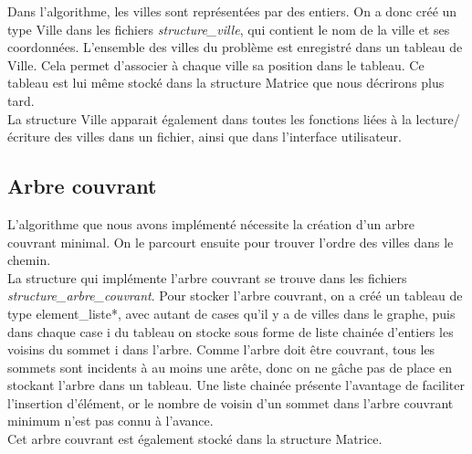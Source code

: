 \documentclass[a4paper,11pt]{article}
\begin{document}
Dans l'algorithme, les villes sont représentées par des entiers. On a donc créé un type \textsf{Ville} dans les fichiers \emph{structure\_ville}, qui contient le nom de la ville et ses coordonnées. L'ensemble des villes du problème est enregistré dans un tableau de \textsf{Ville}. Cela permet d'associer à chaque ville sa position dans le tableau. Ce tableau est lui même stocké dans la structure \textsf{Matrice} que nous décrirons plus tard.\\
La structure Ville apparait également dans toutes les fonctions liées à la lecture/écriture des villes dans un fichier, ainsi que dans l'interface utilisateur.

\subsection{Arbre couvrant}

L'algorithme que nous avons implémenté nécessite la création d'un arbre couvrant minimal. On le parcourt ensuite pour trouver l'ordre des villes dans le chemin.\\
La structure qui implémente l'arbre couvrant se trouve dans les fichiers \emph{structure\_arbre\_couvrant}. 
Pour stocker l'arbre couvrant, on a créé un tableau de type \textsf{element\_liste*}, avec autant de cases qu'il y a de villes dans le graphe, puis dans chaque case i du tableau on stocke sous forme de liste chainée d'entiers les voisins du sommet i dans l'arbre. Comme l'arbre doit être couvrant, tous les sommets sont incidents à au moins une arête, donc on ne gâche pas de place en stockant l'arbre dans un tableau. Une liste chainée présente l'avantage de faciliter l'insertion d'élément, or le nombre de voisin d'un sommet dans l'arbre couvrant minimum n'est pas connu à l'avance.\\
Cet arbre couvrant est également stocké dans la structure Matrice.
\end{document}
